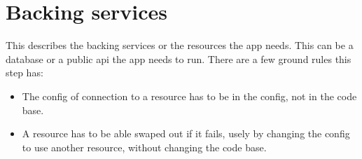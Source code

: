 \section*{Backing services}
This describes the backing services or the resources the app needs. This can be a database or a public api the app needs to run.
There are a few ground rules this step has:

\begin{itemize}
\item The config of connection to a resource has to be in the config, not in the code base.
\item A resource has to be able swaped out if it fails, usely by changing the config to use another resource, without changing the code base.

\end{itemize}